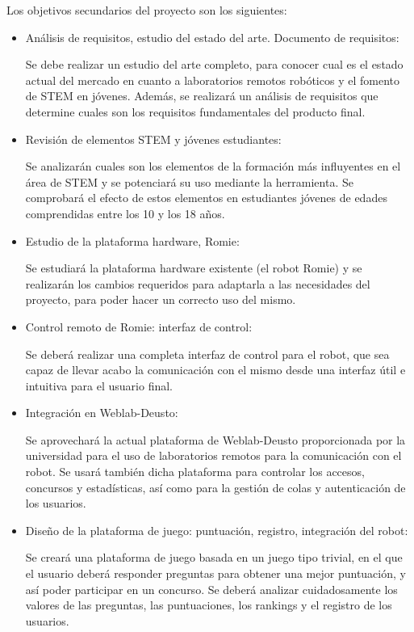 Los objetivos secundarios del proyecto son los siguientes:
\begin{itemize}
\item Análisis de requisitos, estudio del estado del arte. Documento de requisitos:

Se debe realizar un estudio del arte completo, para conocer cual es el estado actual del mercado en
cuanto a laboratorios remotos robóticos y el fomento de STEM en jóvenes. Además, se realizará un
análisis de requisitos que determine cuales son los requisitos fundamentales del producto final.

\item Revisión de elementos STEM y jóvenes estudiantes:

Se analizarán cuales son los elementos de la formación más influyentes en el área de STEM y se
potenciará su uso mediante la herramienta. Se comprobará el efecto de estos elementos en estudiantes
jóvenes de edades comprendidas entre los 10 y los 18 años.

\item Estudio de la plataforma hardware, Romie:

Se estudiará la plataforma hardware existente (el robot Romie) y se realizarán los cambios
requeridos para adaptarla a las necesidades del proyecto, para poder hacer un correcto uso del
mismo.

\item Control remoto de Romie: interfaz de control:

Se deberá realizar una completa interfaz de control para el robot, que sea capaz de llevar acabo la
comunicación con el mismo desde una interfaz útil e intuitiva para el usuario final.

\item Integración en Weblab-Deusto:

Se aprovechará la actual plataforma de Weblab-Deusto proporcionada por la universidad para el uso de
laboratorios remotos para la comunicación con el robot. Se usará también dicha plataforma para
controlar los accesos, concursos y estadísticas, así como para la gestión de colas y autenticación
de los usuarios.

\item Diseño de la plataforma de juego: puntuación, registro, integración del robot:

Se creará una plataforma de juego basada en un juego tipo trivial, en el que el usuario deberá
responder preguntas para obtener una mejor puntuación, y así poder participar en un concurso. Se
deberá analizar cuidadosamente los valores de las preguntas, las puntuaciones, los rankings y el
registro de los usuarios.


\end{itemize}
